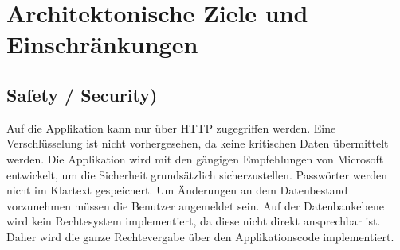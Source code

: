 \chapter{Architektonische Ziele und Einschränkungen}
	\section{Safety / Security)}
	Auf die Applikation kann nur über HTTP zugegriffen werden. Eine Verschlüsselung ist nicht vorhergesehen, da keine kritischen Daten übermittelt werden. Die Applikation wird mit den gängigen Empfehlungen von Microsoft entwickelt, um die Sicherheit grundsätzlich sicherzustellen.
	Passwörter werden nicht im Klartext gespeichert. Um Änderungen an dem Datenbestand vorzunehmen müssen die Benutzer angemeldet sein.
	Auf der Datenbankebene wird kein Rechtesystem implementiert, da diese nicht direkt ansprechbar ist. Daher wird die ganze Rechtevergabe über den Applikationscode implementiert.